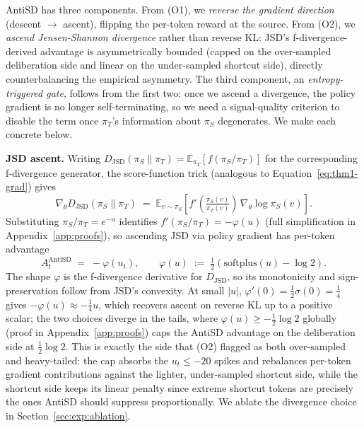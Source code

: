 \documentclass{llmxive}
\begin{document}
AntiSD has three components. From (O1), we \emph{reverse the gradient direction} (descent $\to$ ascent), flipping the per-token reward at the source. From (O2), we \emph{ascend Jensen-Shannon divergence} rather than reverse KL: JSD's f-divergence-derived advantage is asymmetrically bounded (capped on the over-sampled deliberation side and linear on the under-sampled shortcut side), directly counterbalancing the empirical asymmetry. The third component, an \emph{entropy-triggered gate}, follows from the first two: once we ascend a divergence, the policy gradient is no longer self-terminating, so we need a signal-quality criterion to disable the term once $\pi_T$'s information about $\pi_S$ degenerates. We make each concrete below.

\textbf{JSD ascent.}
Writing $D_{\mathrm{JSD}}(\pi_S \| \pi_T) = \mathbb{E}_{\pi_T}[f(\pi_S/\pi_T)]$ for the corresponding f-divergence generator, the score-function trick (analogous to Equation~\eqref{eq:thm1-grad}) gives
\begin{equation}
  \label{eq:fdiv-grad}
  \nabla_\theta D_{\mathrm{JSD}}(\pi_S \| \pi_T) \;=\; \mathbb{E}_{v \sim \pi_S}\!\left[ f'\!\left(\tfrac{\pi_S(v)}{\pi_T(v)}\right) \, \nabla_\theta \log \pi_S(v) \right].
\end{equation}
Substituting $\pi_S/\pi_T = e^{-u}$ identifies $f'(\pi_S/\pi_T) = -\varphi(u)$ (full simplification in Appendix~\ref{app:proofs}), so ascending JSD via policy gradient has per-token advantage
\begin{equation}
  \label{eq:antisd-advantage}
  A_t^{\mathrm{AntiSD}} \;=\; -\varphi(u_t), \qquad \varphi(u) \;:=\; \tfrac{1}{2}\!\left(\mathrm{softplus}(u) - \log 2\right).
\end{equation}
The shape $\varphi$ is the f-divergence derivative for $D_{\mathrm{JSD}}$, so its monotonicity and sign-preservation follow from JSD's convexity. At small $|u|$, $\varphi'(0) = \tfrac{1}{2}\sigma(0) = \tfrac{1}{4}$ gives $-\varphi(u) \approx -\tfrac{1}{4} u$, which recovers ascent on reverse KL up to a positive scalar; the two choices diverge in the tails, where $\varphi(u) \ge -\tfrac{1}{2}\log 2$ globally (proof in Appendix~\ref{app:proofs}) caps the AntiSD advantage on the deliberation side at $\tfrac{1}{2}\log 2$. This is exactly the side that (O2) flagged as both over-sampled and heavy-tailed: the cap absorbs the $u_t \le -20$ spikes and rebalances per-token gradient contributions against the lighter, under-sampled shortcut side, while the shortcut side keeps its linear penalty since extreme shortcut tokens are precisely the ones AntiSD should suppress proportionally. We ablate the divergence choice in Section~\ref{sec:exp:ablation}.
\end{document}
